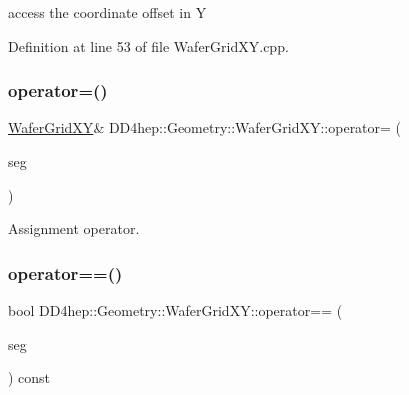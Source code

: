access the coordinate offset in Y 



Definition at line 53 of file Wafer\+Grid\+X\+Y.\+cpp.

\hypertarget{class_d_d4hep_1_1_geometry_1_1_wafer_grid_x_y_a628ab65311ab225b0ca4f39fe8e161e6}{}\label{class_d_d4hep_1_1_geometry_1_1_wafer_grid_x_y_a628ab65311ab225b0ca4f39fe8e161e6} 
\subsubsection{\texorpdfstring{operator=()}{operator=()}}
{\footnotesize\ttfamily \hyperlink{class_d_d4hep_1_1_geometry_1_1_wafer_grid_x_y}{Wafer\+Grid\+XY}\& D\+D4hep\+::\+Geometry\+::\+Wafer\+Grid\+X\+Y\+::operator= (\begin{DoxyParamCaption}\item[{const \hyperlink{class_d_d4hep_1_1_geometry_1_1_wafer_grid_x_y}{Wafer\+Grid\+XY} \&}]{seg }\end{DoxyParamCaption})\hspace{0.3cm}{\ttfamily [default]}}



Assignment operator. 

\hypertarget{class_d_d4hep_1_1_geometry_1_1_wafer_grid_x_y_aa0c5e177c3e8a2c17d4800ab3bfc1d59}{}\label{class_d_d4hep_1_1_geometry_1_1_wafer_grid_x_y_aa0c5e177c3e8a2c17d4800ab3bfc1d59} 
\subsubsection{\texorpdfstring{operator==()}{operator==()}}
{\footnotesize\ttfamily bool D\+D4hep\+::\+Geometry\+::\+Wafer\+Grid\+X\+Y\+::operator== (\begin{DoxyParamCaption}\item[{const \hyperlink{class_d_d4hep_1_1_geometry_1_1_wafer_grid_x_y}{Wafer\+Grid\+XY} \&}]{seg }\end{DoxyParamCaption}) const\hspace{0.3cm}{\ttfamily [inline]}}



